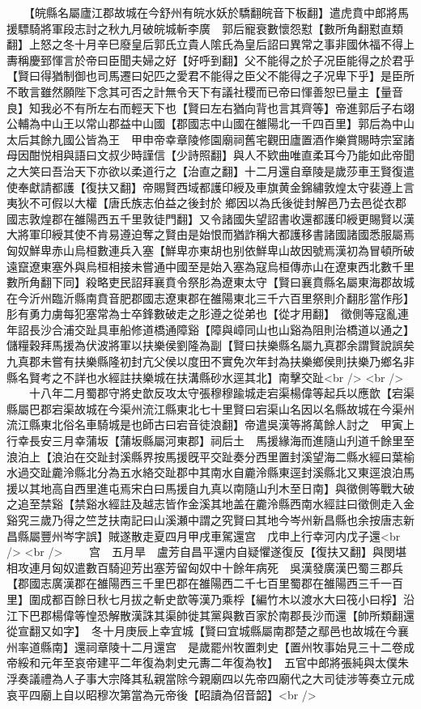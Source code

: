 　　【皖縣名屬廬江郡故城在今舒州有皖水妖於驕翻皖音下板翻】遣虎賁中郎將馬援驃騎將軍段志討之秋九月破皖城斬李廣　郭后寵衰數懷怨懟【數所角翻懟直類翻】上怒之冬十月辛巳廢皇后郭氏立貴人隂氏為皇后詔曰異常之事非國休福不得上夀稱慶郅惲言於帝曰臣聞夫婦之好【好呼到翻】父不能得之於子况臣能得之於君乎【賢曰得猶制御也司馬遷曰妃匹之愛君不能得之臣父不能得之子况卑下乎】是臣所不敢言雖然願陛下念其可否之計無令天下有議社稷而已帝曰惲善恕已量主【量音良】知我必不有所左右而輕天下也【賢曰左右猶向背也言其齊等】帝進郭后子右翊公輔為中山王以常山郡益中山國【郡國志中山國在雒陽北一千四百里】郭后為中山太后其餘九國公皆為王　甲申帝幸章陵修園廟祠舊宅觀田廬置酒作樂賞賜時宗室諸母因酣悦相與語曰文叔少時謹信【少詩照翻】與人不欵曲唯直柔耳今乃能如此帝聞之大笑曰吾治天下亦欲以柔道行之【治直之翻】十二月還自章陵是歲莎車王賢復遣使奉獻請都護【復扶又翻】帝賜賢西域都護印綬及車旗黄金錦繡敦煌太守裴遵上言夷狄不可假以大權【唐氏族志伯益之後封於鄉因以為氏後徙封解邑乃去邑從衣郡國志敦煌郡在雒陽西五千里敦徒門翻】又令諸國失望詔書收還都護印綬更賜賢以漢大將軍印綬其使不肯易遵迫奪之賢由是始恨而猶詐稱大都護移書諸國諸國悉服屬焉匈奴鮮卑赤山烏桓數連兵入塞【鮮卑亦東胡也别依鮮卑山故因號焉漢初為冒頓所破遠竄遼東塞外與烏桓相接未嘗通中國至是始入塞為寇烏桓傳赤山在遼東西北數千里數所角翻下同】殺略吏民詔拜襄賁令祭肜為遼東太守【賢曰襄賁縣名屬東海郡故城在今沂州臨沂縣南賁音肥郡國志遼東郡在雒陽東北三千六百里祭則介翻肜當作彤】肜有勇力虜每犯塞常為士卒鋒數破走之肜遵之從弟也【從才用翻】　徵側等寇亂連年詔長沙合浦交趾具車船修道橋通障谿【障與嶂同山也山谿為阻則治橋道以通之】儲糧穀拜馬援為伏波將軍以扶樂侯劉隆為副【賢曰扶樂縣名屬九真郡余謂賢說誤矣九真郡未嘗有扶樂縣隆初封亢父侯以度田不實免次年封為扶樂鄉侯則扶樂乃鄉名非縣名賢考之不詳也水經註扶樂城在扶溝縣砂水逕其北】南擊交趾<br />
<br />
　　十八年二月蜀郡守將史歆反攻太守張穆穆踰城走宕渠楊偉等起兵以應歆【宕渠縣屬巴郡宕渠故城在今渠州流江縣東北七十里賢曰宕渠山名因以名縣故城在今渠州流江縣東北俗名車騎城是也師古曰宕音徒浪翻】帝遣吳漢等將萬餘人討之　甲寅上行幸長安三月幸蒲坂【蒲坂縣屬河東郡】祠后土　馬援緣海而進隨山刋道千餘里至浪泊上【浪泊在交趾封溪縣界按馬援旣平交趾奏分西里置封溪望海二縣水經曰葉榆水過交趾麊泠縣北分為五水絡交趾郡中其南水自麊泠縣東逕封溪縣北又東逕浪泊馬援以其地高自西里進屯焉宋白曰馬援自九真以南隨山刋木至日南】與徵側等戰大破之追至禁谿【禁谿水經註及越志皆作金溪其地盖在麊泠縣西南水經註曰徵側走入金谿究三歲乃得之竺芝扶南記曰山溪瀬中謂之究賢曰其地今岑州新昌縣也余按唐志新昌縣屬豐州岑字誤】賊遂散走夏四月甲戌車駕還宫　戊申上行幸河内戊子還<br />
<br />
　　宫　五月旱　盧芳自昌平還内自疑懼遂復反【復扶又翻】與閔堪相攻連月匈奴遣數百騎迎芳出塞芳留匈奴中十餘年病死　吳漢發廣漢巴蜀三郡兵【郡國志廣漢郡在雒陽西三千里巴郡在雒陽西二千七百里蜀郡在雒陽西三千一百里】圍成都百餘日秋七月拔之斬史歆等漢乃乘桴【編竹木以渡水大曰筏小曰桴】沿江下巴郡楊偉等惶恐解散漢誅其渠帥徙其黨與數百家於南郡長沙而還【帥所類翻還從宣翻又如字】　冬十月庚辰上幸宜城【賢曰宜城縣屬南郡楚之鄢邑也故城在今襄州率道縣南】還祠章陵十二月還宫　是歲罷州牧置刺史【置州牧事始見三十二卷成帝綏和元年至哀帝建平二年復為刺史元夀二年復為牧】　五官中郎將張純與太僕朱浮奏議禮為人子事大宗降其私親當除今親廟四以先帝四廟代之大司徒涉等奏立元成哀平四廟上自以昭穆次第當為元帝後【昭讀為佋音韶】<br />
